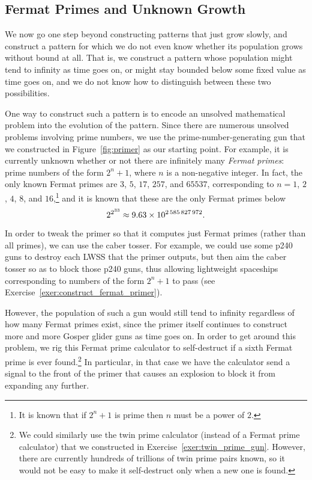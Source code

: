 

\subsection{Fermat Primes and Unknown Growth}\label{sec:unknown_growth}

We now go one step beyond constructing patterns that just grow slowly, and construct a pattern for which we do not even know whether its population grows without bound at all. That is, we construct a pattern whose population might tend to infinity as time goes on, or might stay bounded below some fixed value as time goes on, and we do not know how to distinguish between these two possibilities.

One way to construct such a pattern is to encode an unsolved mathematical problem into the evolution of the pattern. Since there are numerous unsolved problems involving prime numbers, we use the prime-number-generating gun that we constructed in Figure~\ref{fig:primer} as our starting point. For example, it is currently unknown whether or not there are infinitely many \emph{Fermat primes}: prime numbers of the form $2^n + 1$, where $n$ is a non-negative integer. In fact, the only known Fermat primes are $3$, $5$, $17$, $257$, and $65537$, corresponding to $n = 1$, $2$, $4$, $8$, and $16$,\footnote{It is known that if $2^n+1$ is prime then $n$ must be a power of $2$.} and it is known that these are the only Fermat primes below
\[
2^{2^{33}} \approx 9.63 \times 10^{2{\,}585{\,}827{\,}972}.
\]

In order to tweak the primer so that it computes just Fermat primes (rather than all primes), we can use the caber tosser. For example, we could use some p240 guns to destroy each LWSS that the primer outputs, but then aim the caber tosser so as to block those p240 guns, thus allowing lightweight spaceships corresponding to numbers of the form $2^n+1$ to pass (see Exercise~\ref{exer:construct_fermat_primer}).

However, the population of such a gun would still tend to infinity regardless of how many Fermat primes exist, since the primer itself continues to construct more and more Gosper glider guns as time goes on. In order to get around this problem, we rig this Fermat prime calculator to self-destruct if a sixth Fermat prime is ever found.\footnote{We could similarly use the twin prime calculator (instead of a Fermat prime calculator) that we constructed in Exercise~\ref{exer:twin_prime_gun}. However, there are currently hundreds of trillions of twin prime pairs known, so it would not be easy to make it self-destruct only when a new one is found.} In particular, in that case we have the calculator send a signal to the front of the primer that causes an explosion to block it from expanding any further.

